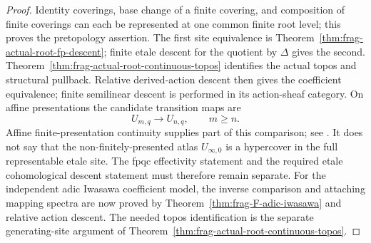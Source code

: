 \documentclass[11pt]{article}
\theoremstyle{definition}
\theoremstyle{remark}
\begin{document}
\begin{proof}
Identity coverings, base change of a finite covering, and composition of
finite coverings can each be represented at one common finite root level;
this proves the pretopology assertion.  The first site equivalence is
Theorem~\ref{thm:frag-actual-root-fp-descent}; finite etale descent for the quotient by $\Delta$ gives the second.
Theorem~\ref{thm:frag-actual-root-continuous-topos} identifies the
actual topos and structural pullback.  Relative derived-action descent
then gives the coefficient equivalence; finite semilinear descent is
performed in its action-sheaf category.
On affine presentations the
candidate transition maps are
\begin{equation}
U_{m,q}\longrightarrow U_{n,q},\qquad m\ge n.
\label{eq:frag-compatible-affine-root-groupoids}
\end{equation}
Affine finite-presentation continuity supplies part of this comparison; see
\cite[Tags 07SK, 07SL, and 07SN]{StacksProject}.  It does not say that the
non-finitely-presented atlas $U_{\infty,0}$ is a hypercover in the full
representable etale site.  The fpqc effectivity statement and the required
etale cohomological descent statement must therefore remain separate.
For the independent adic Iwasawa coefficient model, the inverse
comparison and attaching mapping spectra are now proved by
Theorem~\ref{thm:frag-F-adic-iwasawa} and relative action descent.
The needed topos identification is the separate generating-site argument
of Theorem~\ref{thm:frag-actual-root-continuous-topos}.
\end{proof}
\end{document}
